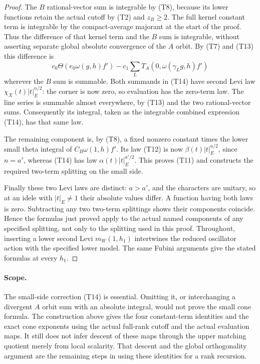 \begin{proof}
The \(B\) rational-vector sum is integrable by (T8), because its
lower functions retain the actual cutoff by (T2) and
\(z_B\ge2\). The full kernel constant term is integrable by the
compact-average majorant at the start of the proof. Thus the
difference of that kernel term and the \(B\) sum is integrable,
without asserting separate global absolute convergence of the
\(A\) orbit. By (T7) and (T13) this difference is
\[
 c_0\Theta(e_0\omega(g,h)f')
       -c_1\sum_L T_A(0,\omega(\gamma_Lg,h)f')
 \tag{T14}\label{eq:sr-theta-small-alpha-correction}
\]
wherever the \(B\) sum is summable. Both summands in (T14) have
second Levi law \(\chi_X(t)|t|_E^{n/2}\): the corner is now zero,
so evaluation has the zero-term law. The line series is summable
almost everywhere, by (T13) and the two rational-vector sums.
Consequently its integral, taken as the integrable combined
expression (T14), has that same law.

The remaining component is, by (T8), a fixed nonzero constant times
the lower small theta integral of \(C_B\omega(1,h)f'\).
Its law (T12) is now
\(\beta(t)|t|_E^{a/2}\), since \(n=a'\), whereas (T14) has law
\(\alpha(t)|t|_E^{a'/2}\). This proves (T11) and constructs the
required two-term splitting on the small side.

Finally these two Levi laws are distinct: \(a>a'\), and the
characters are unitary, so at an idele with \(|t|_E\ne1\) their
absolute values differ. A function having both laws is zero.
Subtracting any two two-term splittings shows their components
coincide. Hence the formulas just proved apply to the actual named
components of any specified splitting, not only to the splitting
used in this proof. Throughout, inserting a lower second Levi
\(m_W(1,h_1)\) intertwines the reduced oscillator action with the
specified lower model. The same Fubini arguments give the stated
formulas at every \(h_1\).
\end{proof}

\paragraph{Scope.}
\label{rem:sr-theta-ct-scope}
The small-side correction (T14) is essential. Omitting it, or
interchanging a divergent \(A\) orbit sum with an absolute integral,
would not prove the small cone formula. The construction above gives
the four constant-term identities and the exact cone exponents using
the actual full-rank cutoff and the actual evaluation maps. It still
does not infer descent of these maps through the upper matching
quotient merely from local scalarity. That descent and the global
orthogonality argument are the remaining steps in using these
identities for a rank recursion.

